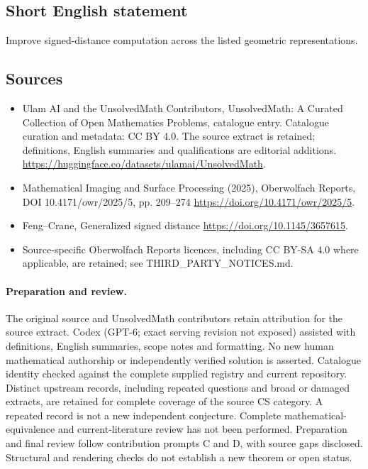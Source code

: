 \documentclass[11pt]{article}
\begin{document}
\subsection{Short English statement}
Improve signed-distance computation across the listed geometric representations.
\subsection{Sources}
\begin{itemize}
\item[\hypertarget{source:statement:1}{S1}] Ulam AI and the UnsolvedMath Contributors, UnsolvedMath: A Curated Collection of Open Mathematics Problems, catalogue entry. Catalogue curation and metadata: CC BY 4.0. The source extract is retained; definitions, English summaries and qualifications are editorial additions.
\url{https://huggingface.co/datasets/ulamai/UnsolvedMath}.
\item[\hypertarget{source:statement:2}{S2}] Mathematical Imaging and Surface Processing (2025), Oberwolfach Reports, DOI 10.4171/owr/2025/5, pp. 209--274
\url{https://doi.org/10.4171/owr/2025/5}.
\item[\hypertarget{source:statement:3}{S3}] Feng--Crane, Generalized signed distance
\url{https://doi.org/10.1145/3657615}.
\item Source-specific Oberwolfach Reports licences, including CC BY-SA 4.0 where applicable, are retained; see THIRD\_PARTY\_NOTICES.md.
\end{itemize}
\paragraph{Preparation and review.}
The original source and UnsolvedMath contributors retain attribution for the source extract. Codex (GPT-6; exact serving revision not exposed) assisted with definitions, English summaries, scope notes and formatting. No new human mathematical authorship or independently verified solution is asserted. Catalogue identity checked against the complete supplied registry and current repository. Distinct upstream records, including repeated questions and broad or damaged extracts, are retained for complete coverage of the source CS category. A repeated record is not a new independent conjecture. Complete mathematical-equivalence and current-literature review has not been performed. Preparation and final review follow contribution prompts C and D, with source gaps disclosed. Structural and rendering checks do not establish a new theorem or open status.
\label{end:statement}
\end{document}
